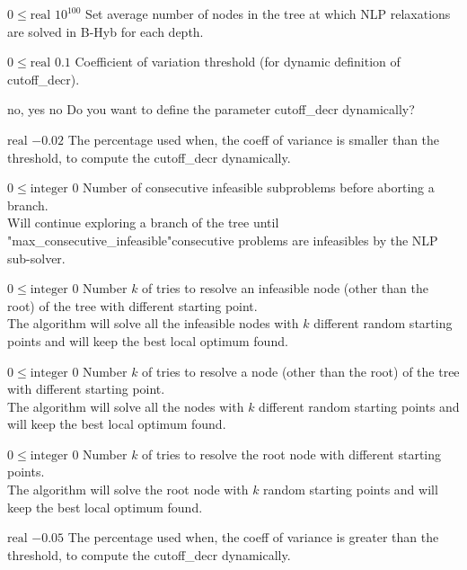 %
{$0\leq\textrm{real}$}%
{$10^{ 100}$}%
{Set average number of nodes in the tree at which NLP relaxations are solved in B-Hyb for each depth.}%
{}

%
{$0\leq\textrm{real}$}%
{$0.1$}%
{Coefficient of variation threshold (for dynamic definition of cutoff\_decr).}%
{}

%
{\ttfamily no, yes}%
{no}%
{Do you want to define the parameter cutoff\_decr dynamically?}%
{
}

%
{$\textrm{real}$}%
{$-0.02$}%
{The percentage used when, the coeff of variance is smaller than the threshold, to compute the cutoff\_decr dynamically.}%
{}

%
{$0\leq\textrm{integer}$}%
{$0$}%
{Number of consecutive infeasible subproblems before aborting a branch.\\
Will continue exploring a branch of the tree until "max\_consecutive\_infeasible"consecutive problems are infeasibles by the NLP sub-solver.}%
{}

%
{$0\leq\textrm{integer}$}%
{$0$}%
{Number $k$ of tries to resolve an infeasible node (other than the root) of the tree with different starting point.\\
The algorithm will solve all the infeasible nodes with $k$ different random starting points and will keep the best local optimum found.}%
{}

%
{$0\leq\textrm{integer}$}%
{$0$}%
{Number $k$ of tries to resolve a node (other than the root) of the tree with different starting point.\\
The algorithm will solve all the nodes with $k$ different random starting points and will keep the best local optimum found.}%
{}

%
{$0\leq\textrm{integer}$}%
{$0$}%
{Number $k$ of tries to resolve the root node with different starting points.\\
The algorithm will solve the root node with $k$ random starting points and will keep the best local optimum found.}%
{}

%
{$\textrm{real}$}%
{$-0.05$}%
{The percentage used when, the coeff of variance is greater than the threshold, to compute the cutoff\_decr dynamically.}%
{}

